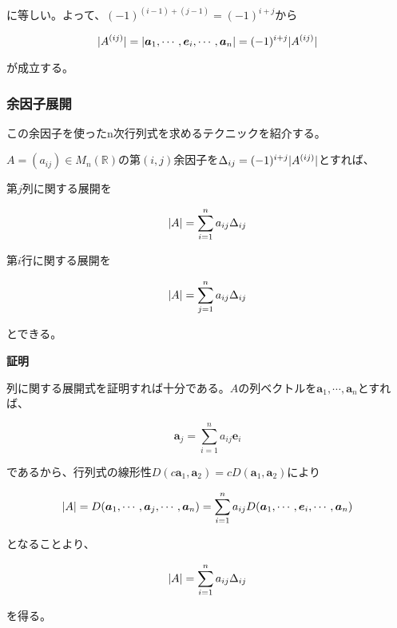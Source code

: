 \documentclass[dvipdfmx,autodetect-engine]{jsarticle}
\DeclarePairedDelimiter{\abs}{\lvert}{\rvert}
\begin{document}
に等しい。よって、$(-1)^{(i-1)+(j-1)} = (-1)^{i+j}$から

$$
\abs{A^{(ij)}} = \abs{\bm{a}_1, \cdots, \bm{e}_i, \cdots, \bm{a}_n} = (-1)^{i+j}\abs{A^{(ij)}}
$$

が成立する。

\subsubsection{余因子展開}

この余因子を使ったn次行列式を求めるテクニックを紹介する。

$A = (a_{ij}) \in M_n(\mathbb{R})$の第$(i,j)$余因子を$\Delta_{ij} = (-1)^{i+j}\abs{A^{(ij)}}$とすれば、

第$j$列に関する展開を

$$
\abs{A} = \sum_{i=1}^{n} a_{ij}\Delta_{ij}
$$

第$i$行に関する展開を

$$
\abs{A} = \sum_{j=1}^{n} a_{ij}\Delta_{ij}
$$

とできる。

{\bf 証明}

列に関する展開式を証明すれば十分である。$A$の列ベクトルを$\bm{a}_1, \cdots, \bm{a}_n$とすれば、

$$
\bm{a}_j = \sum_{i=1}^{n} a_{ij}\bm{e}_i
$$

であるから、行列式の線形性$D(c\bm{a}_1, \bm{a}_2) = cD(\bm{a}_1, \bm{a}_2)$により

$$
\abs{A} = D(\bm{a}_1, \cdots, \bm{a}_j, \cdots, \bm{a}_n) = \sum_{i=1}^{n} a_{ij}D(\bm{a}_1, \cdots, \bm{e}_i, \cdots, \bm{a}_n)
$$

となることより、

$$
\abs{A} = \sum_{i=1}^{n} a_{ij}\Delta_{ij}
$$

を得る。

\end{document}
